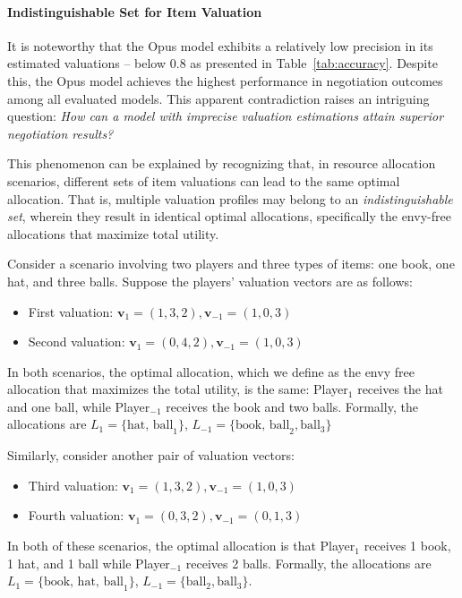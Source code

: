 \paragraph{Indistinguishable Set for Item Valuation}
It is noteworthy that the Opus model exhibits a relatively low precision in its estimated valuations -- below 0.8 as presented in Table~\ref{tab:accuracy}. Despite this, the Opus model achieves the highest performance in negotiation outcomes among all evaluated models. This apparent contradiction raises an intriguing question: \emph{How can a model with imprecise valuation estimations attain superior negotiation results?}

This phenomenon can be explained by recognizing that, in resource allocation scenarios, different sets of item valuations can lead to the same optimal allocation. That is, multiple valuation profiles may belong to an \emph{indistinguishable set}, wherein they result in identical optimal allocations, specifically the envy-free allocations that maximize total utility.

Consider a scenario involving two players and three types of items: one book, one hat, and three balls. Suppose the players' valuation vectors are as follows:

\begin{itemize}
    \item First valuation: $\mathbf{v}_1 = (1, 3, 2), \mathbf{v}_{-1} = (1, 0, 3)$
    \item Second valuation: $\mathbf{v}_1 = (0, 4, 2), \mathbf{v}_{-1} = (1, 0, 3)$
\end{itemize}

In both scenarios, the optimal allocation, which we define as the envy free allocation that maximizes the total utility, is the same: Player$_{1}$ receives the hat and one ball, while Player$_{-1}$ receives the book and two balls. Formally, the allocations are $L_1 = \{\text{hat, ball}_1\}$, $L_{-1} = \{\text{book, ball}_2, \text{ball}_3\}$

Similarly, consider another pair of valuation vectors:

\begin{itemize}
    \item Third valuation: $\mathbf{v}_1 = (1, 3, 2), \mathbf{v}_{-1} = (1, 0, 3)$
    \item Fourth valuation: $\mathbf{v}_1 = (0, 3, 2), \mathbf{v}_{-1} = (0, 1, 3)$
\end{itemize}

In both of these scenarios, the optimal allocation is that Player$_{1}$ receives 1 book, 1 hat, and 1 ball while Player$_{-1}$ receives 2 balls. Formally, the allocations are $L_1 = \{\text{book, hat, ball}_1\}$, $L_{-1} = \{\text{ball}_2, \text{ball}_3\}$.

